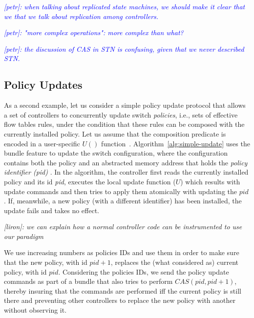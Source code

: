 \documentclass[conference]{sigcomm-alternate}
\newcommand{\ufunc}{U} %
\newcommand{\liron}[1]{\textit{\textcolor{mygreen}{[liron]: #1}}} %
\newcommand{\petr}[1]{\textit{\textcolor{blue}{[petr]: #1}}} %
\begin{document}
\petr{when talking about replicated state machines, we should make it clear that we that we talk about replication among controllers.}

\petr{"more complex operations": more complex than what?}

\petr{the discussion of CAS in STN is confusing, given that we never described STN.}

\subsection{Policy Updates}

As a second example, let us consider a simple policy update protocol that
allows a set of  controllers to concurrently update switch  \emph{policies}, i.e., sets of
effective flow tables rules, under the
condition that these rules can be composed with the currently installed
policy.
Let us assume that the composition predicate is encoded in a user-specific
$\textit{\ufunc}()$ function~\cite{cpc}.
Algorithm~\ref{alg:simple-update} uses the bundle feature to update the switch configuration, where the configuration contains both the policy and an abstracted memory address that holds the \emph{policy identifier (pid)} .
In the algorithm, the controller first reads the currently installed
policy and its id \emph{pid}, executes the local update function ($\textit{\ufunc}$) which results with update commands and then tries to apply them atomically with updating the $pid$. If, meanwhile, a new
policy (with a different identifier) has been installed, the update
fails and takes no effect.


\liron{we can explain how a normal controller code can be instrumented to use our paradigm}


We use increasing numbers as policies
IDs and use them in order to make sure that the new policy, with id
$pid+1$, replaces the (what considered as) current policy, with id
$pid$. Considering the policies IDs, we send the policy update
commands as part of a bundle that also tries to perform
$CAS(pid,pid+1)$, thereby insuring that the commands are
performed iff the current policy is still there and preventing other
controllers to replace the new policy with another without observing it.

\end{document}
